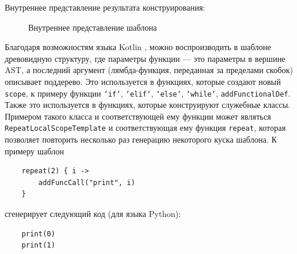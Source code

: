 Внутреннее представление результата конструирования:
\begin{figure}[ht]
    \begin{center}
        \caption{\label{class_tree} Внутреннее представление шаблона}
    \end{center}
\end{figure}

Благодаря возможностям языка Kotlin \cite{kotlin-dsl}, можно воспроизводить в шаблоне древовидную структуру, где параметры
функции --- это параметры в вершине AST, а последний аргумент (лямбда-функция, переданная за пределами скобок)
описывает поддерево. Это используется в функциях, которые создают новый \texttt{scope}, к примеру
функции \texttt{`if`}, \texttt{`elif`}, \texttt{`else`}, \texttt{`while`},
\texttt{addFunctionalDef}. Также это используется в функциях, которые конструируют
служебные классы.
Примером такого класса и соответствующей ему функции может являться \texttt{RepeatLocalScopeTemplate} и
соответствующая ему функция \texttt{repeat}, которая позволяет повторить несколько раз генерацию
некоторого куска шаблона. К примеру шаблон
\begin{verbatim}
    repeat(2) { i ->
        addFuncCall("print", i)
    }
\end{verbatim}

сгенерирует следующий код (для языка Python):

\begin{verbatim}
    print(0)
    print(1)    
\end{verbatim}

